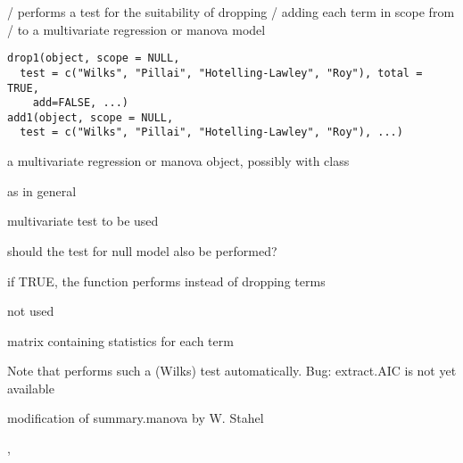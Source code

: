 \documentclass{article}
\begin{document}
\begin{Description}\relax
{} /  performs a test for the suitability
of dropping / adding each term in scope from / to a multivariate
regression or manova model
\end{Description}
\begin{Usage}
\begin{verbatim}
drop1(object, scope = NULL,
  test = c("Wilks", "Pillai", "Hotelling-Lawley", "Roy"), total = TRUE,
    add=FALSE, ...)
add1(object, scope = NULL,
  test = c("Wilks", "Pillai", "Hotelling-Lawley", "Roy"), ...)
\end{verbatim}
\end{Usage}
\begin{Arguments}
\begin{ldescription}
\item[\code{object}] a multivariate regression or manova object, possibly
with class 
\item[\code{scope}] as in general  
\item[\code{test}] multivariate test to be used
\item[\code{total}] should the test for null model also be performed?
\item[\code{add}] if TRUE, the function performs  instead of
dropping terms
\item[\code{...}] not used
\end{ldescription}
\end{Arguments}
\begin{Value}
matrix containing statistics for each term
\end{Value}
\begin{Note}\relax
Note that  performs such a (Wilks) test automatically.
Bug: extract.AIC is not yet available
\end{Note}
\begin{Author}\relax
modification of summary.manova by W. Stahel
\end{Author}
\begin{SeeAlso}\relax
{}, 
\end{SeeAlso}
\begin{Examples}
\end{Examples}
\end{document}

